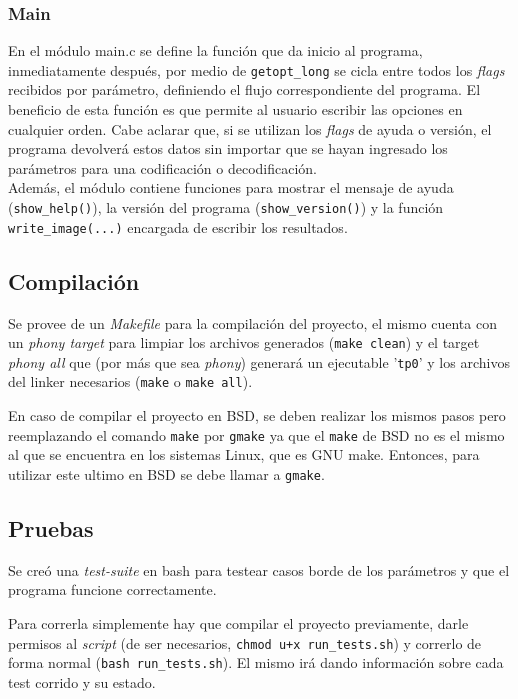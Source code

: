 \documentclass[10pt,a4paper]{article}
\begin{document}
\subsubsection{Main}
En el módulo main.c se define la función que da inicio al programa, inmediatamente después, por medio de \texttt{getopt\_long} se cicla entre todos los \textit{flags} recibidos por parámetro, definiendo el flujo correspondiente del programa. El beneficio de esta función es que permite al usuario escribir las opciones en cualquier orden. Cabe aclarar que, si se utilizan los \textit{flags} de ayuda o versión, el programa devolverá estos datos sin importar que se hayan ingresado los parámetros para una codificación o decodificación.\\
Además, el módulo contiene funciones para mostrar el mensaje de ayuda (\texttt{show\_help()}), la versión del programa (\texttt{show\_version()}) y la función \texttt{write\_image(...)} encargada de escribir los resultados.

\subsection{Compilación}
Se provee de un \textit{Makefile} para la compilación del proyecto, el mismo cuenta con un\textit{ phony target} para limpiar los archivos generados (\texttt{make clean}) y el target \textit{phony all} que (por más que sea \textit{phony}) generará un ejecutable '\texttt{tp0}' y los archivos del linker necesarios (\texttt{make} o \texttt{make all}).

En caso de compilar el proyecto en BSD, se deben realizar los mismos pasos pero reemplazando el comando \texttt{make} por \texttt{gmake} ya que el \texttt{make} de BSD no es el mismo al que se encuentra en los sistemas Linux, que es GNU make. Entonces, para utilizar este ultimo en BSD se debe llamar a \texttt{gmake}. 

\subsection{Pruebas}
Se creó una \textit{test-suite} en bash para testear casos borde de los parámetros y que el programa funcione correctamente. 

Para correrla simplemente hay que compilar el proyecto previamente, darle permisos al \textit{script} (de ser necesarios, \texttt{chmod u+x run\_tests.sh}) y correrlo de forma normal (\texttt{bash run\_tests.sh}). El mismo irá dando información sobre cada test corrido y su estado.
\end{document}
